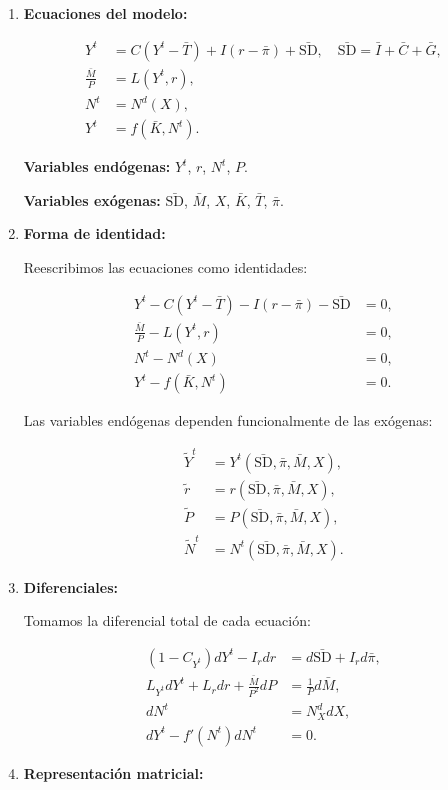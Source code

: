 \documentclass[
  doc,
  floatsintext,
  longtable,
  a4paper,
  nolmodern,
  notxfonts,
  notimes,
  colorlinks=true,linkcolor=blue,citecolor=blue,urlcolor=blue]{apa7}
\begin{document}
\begin{enumerate}
\def\labelenumi{\arabic{enumi}.}
\item
  \textbf{Ecuaciones del modelo:}

  \[
  \begin{aligned}
  Y^t &= C(Y^t - \bar{T}) + I(r - \bar{\pi}) + \bar{\mathrm{SD}}, \quad \bar{\mathrm{SD}} = \bar{I} + \bar{C} + \bar{G}, \\
  \frac{\bar{M}}{P} &= L(Y^t, r), \\
  N^t &= N^d(X), \\
  Y^t &= f(\bar{K}, N^t).
  \end{aligned}
  \]

  \textbf{Variables endógenas:} \(Y^t\), \(r\), \(N^t\), \(P\).

  \textbf{Variables exógenas:} \(\bar{\mathrm{SD}}\), \(\bar{M}\),
  \(X\), \(\bar{K}\), \(\bar{T}\), \(\bar{\pi}\).
\item
  \textbf{Forma de identidad:}

  Reescribimos las ecuaciones como identidades:

  \[
  \begin{aligned}
  Y^t - C(Y^t - \bar{T}) - I(r - \bar{\pi}) - \bar{\mathrm{SD}} &= 0, \\
  \frac{\bar{M}}{P} - L(Y^t, r) &= 0, \\
  N^t - N^d(X) &= 0, \\
  Y^t - f(\bar{K}, N^t) &= 0.
  \end{aligned}
  \]

  Las variables endógenas dependen funcionalmente de las exógenas:

  \[
  \begin{aligned}
  \tilde{Y}^t &= Y^t(\bar{\mathrm{SD}}, \bar{\pi}, \bar{M}, X), \\
  \tilde{r} &= r(\bar{\mathrm{SD}}, \bar{\pi}, \bar{M}, X), \\
  \tilde{P} &= P(\bar{\mathrm{SD}}, \bar{\pi}, \bar{M}, X), \\
  \tilde{N}^t &= N^t(\bar{\mathrm{SD}}, \bar{\pi}, \bar{M}, X).
  \end{aligned}
  \]
\item
  \textbf{Diferenciales:}

  Tomamos la diferencial total de cada ecuación:

  \[
  \begin{aligned}
  (1 - C_{Y^t}) dY^t - I_r dr &= d\bar{\mathrm{SD}} + I_r d\bar{\pi}, \\
  L_{Y^t} dY^t + L_r dr + \frac{\bar{M}}{P^2} dP &= \frac{1}{P} d\bar{M}, \\
  dN^t &= N^d_X dX, \\
  dY^t - f'(N^t) dN^t &= 0.
  \end{aligned}
  \]
\item
  \textbf{Representación matricial:}


\end{enumerate}
\end{document}
